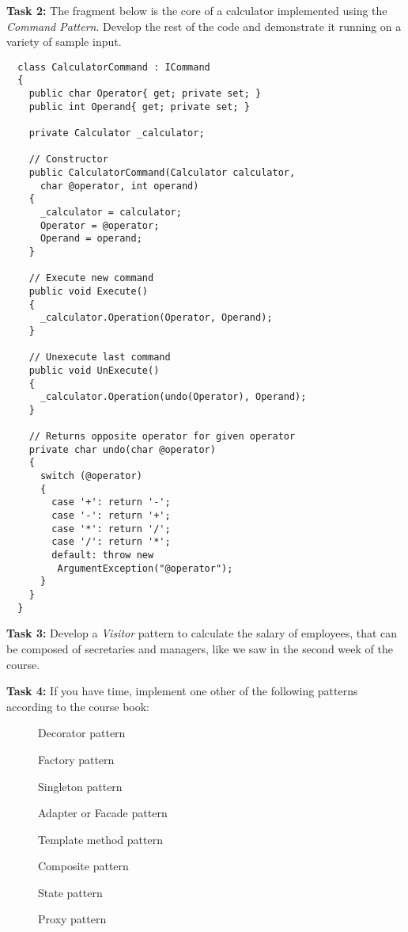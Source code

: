 \documentclass{article}
\begin{document}
  \noindent \textbf{Task 2:} The fragment below is the core of a calculator implemented using the 
  \emph{Command Pattern}. Develop the rest of the code and demonstrate it running on a variety
  of sample input.
 
 \begin{lstlisting}
  class CalculatorCommand : ICommand
  {
    public char Operator{ get; private set; }
    public int Operand{ get; private set; }

    private Calculator _calculator;
 
    // Constructor
    public CalculatorCommand(Calculator calculator,
      char @operator, int operand)
    {
      _calculator = calculator;
      Operator = @operator;
      Operand = operand;
    }
 
    // Execute new command
    public void Execute()
    {
      _calculator.Operation(Operator, Operand);
    }
 
    // Unexecute last command
    public void UnExecute()
    {
      _calculator.Operation(undo(Operator), Operand);
    }
 
    // Returns opposite operator for given operator
    private char undo(char @operator)
    {
      switch (@operator)
      {
        case '+': return '-';
        case '-': return '+';
        case '*': return '/';
        case '/': return '*';
        default: throw new
         ArgumentException("@operator");
      }
    }
  }
\end{lstlisting}
 
\vspace{0.3cm}

  \noindent \textbf{Task 3:} Develop a \emph{Visitor} pattern to calculate the salary of employees, that
  can be composed of secretaries and managers,
  like we saw in the second week of the course.
  
  \vspace{0.3cm}

  \noindent  \textbf{Task 4:} If you have time, implement one other of the following patterns according to the course book:

    \begin{description}
      \item[] Decorator pattern
      \item[] Factory pattern
      \item[] Singleton pattern
      \item[] Adapter or Facade pattern
      \item[] Template method pattern
      \item[] Composite pattern
      \item[] State pattern
      \item[] Proxy pattern
    \end{description}
\end{document}
